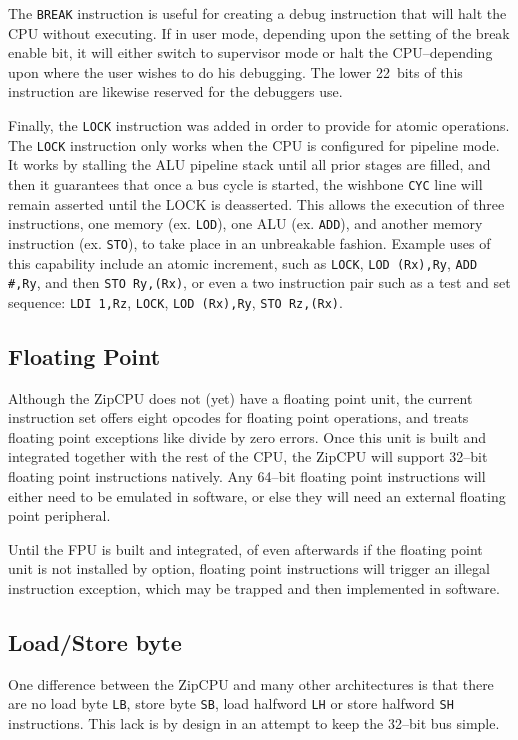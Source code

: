 \documentclass{gqtekspec}
\begin{document}
The {\tt BREAK} instruction is useful for creating a debug instruction that
will halt the CPU without executing.  If in user mode, depending upon the
setting of the break enable bit, it will either switch to supervisor mode or
halt the CPU--depending upon where the user wishes to do his debugging.  The
lower 22~bits of this instruction are likewise reserved for the debuggers
use.

Finally, the {\tt LOCK} instruction was added in order to provide for
atomic operations.  The {\tt LOCK} instruction only works when the CPU is
configured for pipeline mode.  It works by stalling the ALU pipeline stack
until all prior stages are filled, and then it guarantees that once a bus
cycle is started, the wishbone {\tt CYC} line will remain asserted until the
LOCK is deasserted.  This allows the execution of three instructions, one
memory (ex. {\tt LOD}), one ALU (ex. {\tt ADD}), and another memory instruction
(ex. {\tt STO}), to take place in an unbreakable fashion.  Example uses of this
capability include an atomic increment, such as {\tt LOCK}, {\tt LOD (Rx),Ry},
{\tt ADD \#,Ry}, and then {\tt STO Ry,(Rx)}, or even a two instruction pair
such as a test and set sequence: {\tt LDI 1,Rz}, {\tt LOCK}, {\tt LOD (Rx),Ry},
{\tt STO Rz,(Rx)}.

\subsection{Floating Point}
Although the ZipCPU does not (yet) have a floating point unit, the current
instruction set offers eight opcodes for floating point operations, and treats
floating point exceptions like divide by zero errors.  Once this unit is built
and integrated together with the rest of the CPU, the ZipCPU will support
32--bit floating point instructions natively.  Any 64--bit floating point
instructions will either need to be emulated in software, or else they will
need an external floating point peripheral.

Until the FPU is built and integrated, of even afterwards if the floating point
unit is not installed by option, floating point instructions will trigger an
illegal instruction exception, which may be trapped and then implemented in
software.

\subsection{Load/Store byte}
One difference between the ZipCPU and many other architectures is that there are
no load byte {\tt LB}, store byte {\tt SB}, load halfword {\tt LH} or store
halfword {\tt SH} instructions.  This lack is by design in an attempt to keep
the 32--bit bus simple.
\end{document}

